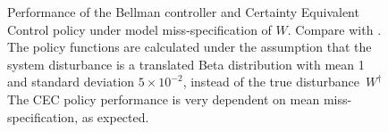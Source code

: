 \documentclass[main.tex]{subfiles}
\begin{document}
\begin{figure}[htbp]
\begin{subfigure}[b]{0.5\textwidth}
  \end{subfigure}
  \caption{Performance of the Bellman controller and Certainty
  Equivalent Control policy under model miss-specification of
  $W$. Compare with .
  The policy functions are calculated under the assumption that
  the system disturbance is a translated Beta distribution with mean 1
  and standard deviation $5\times 10^{-2}$,
  instead
  of the true disturbance~$W^\dagger$
  The CEC policy performance is very dependent on mean miss-specification,
  as expected.
}\label{fig:markdown_bellman_mpc_model_misspecification}
\end{figure}
\end{document}
